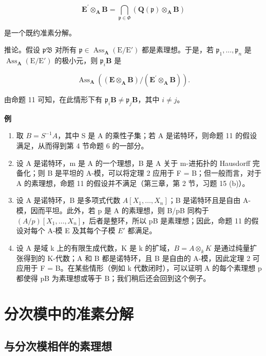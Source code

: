 \[
\mathbf {E} ^ {\prime} \otimes_ {\mathbf {A}} \mathbf {B} = \bigcap_ {\mathfrak {p} \in \Phi} (\mathbf {Q} (\mathfrak {p}) \otimes_ {\mathbf {A}} \mathbf {B})
\]

  是一个既约准素分解。

推论。假设 \(\mathfrak{pB}\) 对所有 \(\mathfrak{p} \in \operatorname{Ass}_{\mathbf{A}}(\mathrm{E}/\mathrm{E}')\) 都是素理想。于是，若 \(\mathfrak{p}_1, \ldots, \mathfrak{p}_n\) 是 \(\operatorname{Ass}_{\mathbf{A}}(\mathrm{E}/\mathrm{E}')\) 的极小元，则 \(\mathfrak{p}_i\mathbf{B}\) 是

\[
\operatorname{Ass} _ {\mathbf {A}} ((\mathbf {E} \otimes_ {\mathbf {A}} \mathbf {B}) / (\mathbf {E} ^ {\prime} \otimes_ {\mathbf {A}} \mathbf {B})).
\]

  由命题 11 可知，在此情形下有 \(\mathfrak{p}_i\mathbf{B} \neq \mathfrak{p}_j\mathbf{B}\)，其中 \(i \neq j\)。

\textbf{例}\par

\begin{enumerate}
\def\labelenumi{(\arabic{enumi})}
\item
  取 \(B = S^{-1}A\)，其中 S 是 A 的乘性子集；若 A 是诺特环，则命题 11 的假设满足，从而得到第 4 节命题 6 的一部分。
\item
  设 A 是诺特环，m 是 A 的一个理想，B 是 A 关于 m-进拓扑的 Hausdorff 完备化；则 B 是平坦的 A-模，可以将定理 2 应用于 F = B；但一般而言，对于 A 的素理想，命题 11 的假设并不满足（第三章，第 2 节，习题 15 (b)）。
\item
  设 A 是诺特环，B 是多项式代数 \(A[X_{1},\ldots,X_{n}]\)；B 是诺特环且是自由 A-模，因而平坦。此外，若 p 是 A 的素理想，则 B/pB 同构于 \((A/p)[X_{1},\ldots,X_{n}]\)，后者是整环，所以 pB 是素理想；因此，命题 11 的假设对每个 A-模 E 及其每个子模 \(E'\) 都满足。
\item
  设 A 是域 k 上的有限生成代数，K 是 k 的扩域，\(B = A \otimes_{k} K\) 是通过纯量扩张得到的 K-代数；A 和 B 都是诺特环，且 B 是自由的 A-模，因此定理 2 可应用于 F = B。在某些情形（例如 k 代数闭时），可以证明 A 的每个素理想 p 都使得 pB 为素理想或等于 B；我们稍后还会回到这个例子。
\end{enumerate}

\section{分次模中的准素分解}

\subsection{与分次模相伴的素理想}

